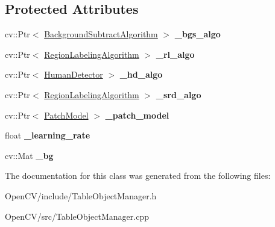 \subsection*{Protected Attributes}
\begin{DoxyCompactItemize}
\item 
\hypertarget{classskl_1_1_table_object_manager_acedbc1b5818e257b1f4636791996cf0b}{}\label{classskl_1_1_table_object_manager_acedbc1b5818e257b1f4636791996cf0b} 
cv\+::\+Ptr$<$ \hyperlink{classskl_1_1_background_subtract_algorithm}{Background\+Subtract\+Algorithm} $>$ {\bfseries \+\_\+bgs\+\_\+algo}
\item 
\hypertarget{classskl_1_1_table_object_manager_add7ec611013512d6493627f8a2590598}{}\label{classskl_1_1_table_object_manager_add7ec611013512d6493627f8a2590598} 
cv\+::\+Ptr$<$ \hyperlink{classskl_1_1_filter_mat2_mat}{Region\+Labeling\+Algorithm} $>$ {\bfseries \+\_\+rl\+\_\+algo}
\item 
\hypertarget{classskl_1_1_table_object_manager_ac0f2d980f736bc5e74d2a97d3e128a64}{}\label{classskl_1_1_table_object_manager_ac0f2d980f736bc5e74d2a97d3e128a64} 
cv\+::\+Ptr$<$ \hyperlink{classskl_1_1_filter_mat2_mat}{Human\+Detector} $>$ {\bfseries \+\_\+hd\+\_\+algo}
\item 
\hypertarget{classskl_1_1_table_object_manager_ada8d03176fe102f291c01b666cc92405}{}\label{classskl_1_1_table_object_manager_ada8d03176fe102f291c01b666cc92405} 
cv\+::\+Ptr$<$ \hyperlink{classskl_1_1_filter_mat2_mat}{Region\+Labeling\+Algorithm} $>$ {\bfseries \+\_\+srd\+\_\+algo}
\item 
\hypertarget{classskl_1_1_table_object_manager_aac9573156ec290e338523dc9042eed4a}{}\label{classskl_1_1_table_object_manager_aac9573156ec290e338523dc9042eed4a} 
cv\+::\+Ptr$<$ \hyperlink{classskl_1_1_patch_model}{Patch\+Model} $>$ {\bfseries \+\_\+patch\+\_\+model}
\item 
\hypertarget{classskl_1_1_table_object_manager_af61405181c1019ff424a4cd677bb790b}{}\label{classskl_1_1_table_object_manager_af61405181c1019ff424a4cd677bb790b} 
float {\bfseries \+\_\+learning\+\_\+rate}
\item 
\hypertarget{classskl_1_1_table_object_manager_abee4df4a50f79b45b4337acd775b1e43}{}\label{classskl_1_1_table_object_manager_abee4df4a50f79b45b4337acd775b1e43} 
cv\+::\+Mat {\bfseries \+\_\+bg}
\end{DoxyCompactItemize}


The documentation for this class was generated from the following files\+:\begin{DoxyCompactItemize}
\item 
Open\+C\+V/include/Table\+Object\+Manager.\+h\item 
Open\+C\+V/src/Table\+Object\+Manager.\+cpp\end{DoxyCompactItemize}
